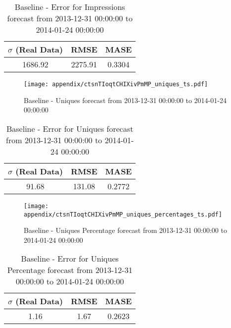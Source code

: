 \begin{table}[H]
\centering
\footnotesize
\begin{tabular}{ccc}
$\sigma$ (Real Data) & RMSE & MASE   \\ \hline
1686.92 & 2275.91 & 0.3304 \\
\end{tabular}

\vspace{0.5cm}

\caption[]{
Baseline - Error for Impressions forecast from 2013-12-31 00:00:00 to 2014-01-24 00:00:00}
\end{table}

\begin{figure}[H] \begin{center} \leavevmode
\texttt{[image: appendix/ctsnTIoqtCHIXivPmMP\_uniques\_ts.pdf]} \caption[]{
Baseline - Uniques forecast from 2013-12-31 00:00:00 to 2014-01-24 00:00:00} \label{fig:appendix/ctsnTIoqtCHIXivPmMP_uniques_ts.pdf} \end{center}
\end{figure}

\begin{table}[H]
\centering
\footnotesize
\begin{tabular}{ccc}
$\sigma$ (Real Data) & RMSE & MASE   \\ \hline
91.68 & 131.08 & 0.2772 \\
\end{tabular}

\vspace{0.5cm}

\caption[]{
Baseline - Error for Uniques forecast from 2013-12-31 00:00:00 to 2014-01-24 00:00:00}
\end{table}

\begin{figure}[H] \begin{center} \leavevmode
\texttt{[image: appendix/ctsnTIoqtCHIXivPmMP\_uniques\_percentages\_ts.pdf]} \caption[]{
Baseline - Uniques Percentage forecast from 2013-12-31 00:00:00 to 2014-01-24 00:00:00} \label{fig:appendix/ctsnTIoqtCHIXivPmMP_uniques_percentages_ts.pdf} \end{center}
\end{figure}

\begin{table}[H]
\centering
\footnotesize
\begin{tabular}{ccc}
$\sigma$ (Real Data) & RMSE & MASE   \\ \hline
1.16 & 1.67 & 0.2623 \\
\end{tabular}

\vspace{0.5cm}

\caption[]{
Baseline - Error for Uniques Percentage forecast from 2013-12-31 00:00:00 to 2014-01-24 00:00:00}
\end{table}

